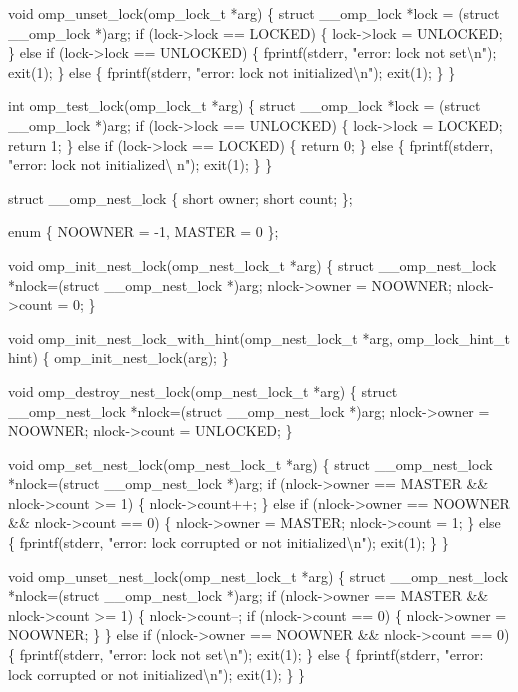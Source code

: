 {\begin{codepar}
void omp\_unset\_lock(omp\_lock\_t *arg)
\{
    struct \_\_omp\_lock *lock = (struct \_\_omp\_lock *)arg;
    if (lock->lock == LOCKED)
    \{
        lock->lock = UNLOCKED;
    \}
    else if (lock->lock == UNLOCKED)
    \{
        fprintf(stderr, "error: lock not set{\textbackslash}n");
        exit(1);
    \}
    else
    \{
        fprintf(stderr, "error: lock not initialized{\textbackslash}n");
        exit(1);
    \}
\}

int omp\_test\_lock(omp\_lock\_t *arg)
\{
    struct \_\_omp\_lock *lock = (struct \_\_omp\_lock *)arg;
    if (lock->lock == UNLOCKED)
    \{
        lock->lock = LOCKED;
        return 1;
    \}
    else if (lock->lock == LOCKED)
    \{
        return 0;
    \}
    else
    \{
        fprintf(stderr, "error: lock not initialized{\textbackslash} n");
        exit(1);
    \}
\}

struct \_\_omp\_nest\_lock
\{
    short owner;
    short count;
\};

enum \{ NOOWNER = -1, MASTER = 0 \};

void omp\_init\_nest\_lock(omp\_nest\_lock\_t *arg)
\{
    struct \_\_omp\_nest\_lock *nlock=(struct \_\_omp\_nest\_lock *)arg;
    nlock->owner = NOOWNER;
    nlock->count = 0;
\}

void omp\_init\_nest\_lock\_with\_hint(omp\_nest\_lock\_t *arg, 
                                  omp\_lock\_hint\_t hint)
\{
    omp\_init\_nest\_lock(arg);
\}

void omp\_destroy\_nest\_lock(omp\_nest\_lock\_t *arg)
\{
    struct \_\_omp\_nest\_lock *nlock=(struct \_\_omp\_nest\_lock *)arg;
    nlock->owner = NOOWNER;
    nlock->count = UNLOCKED;
\}

void omp\_set\_nest\_lock(omp\_nest\_lock\_t *arg)
\{
    struct \_\_omp\_nest\_lock *nlock=(struct \_\_omp\_nest\_lock *)arg;
    if (nlock->owner == MASTER \&\& nlock->count >= 1)
    \{
        nlock->count++;
    \}
    else if (nlock->owner == NOOWNER \&\& nlock->count == 0)
    \{
        nlock->owner = MASTER;
        nlock->count = 1;
    \}
    else
    \{
        fprintf(stderr, "error: lock corrupted or not initialized{\textbackslash}n");
        exit(1);
    \}
\}

void omp\_unset\_nest\_lock(omp\_nest\_lock\_t *arg)
\{
    struct \_\_omp\_nest\_lock *nlock=(struct \_\_omp\_nest\_lock *)arg;
    if (nlock->owner == MASTER \&\& nlock->count >= 1)
    \{
        nlock->count--;
        if (nlock->count == 0)
        \{
            nlock->owner = NOOWNER;
        \}
    \}
    else if (nlock->owner == NOOWNER \&\& nlock->count == 0)
    \{
        fprintf(stderr, "error: lock not set{\textbackslash}n");
        exit(1);
    \}
    else
    \{
        fprintf(stderr, "error: lock corrupted or not initialized{\textbackslash}n");
        exit(1);
    \}
\}


\end{codepar}}
